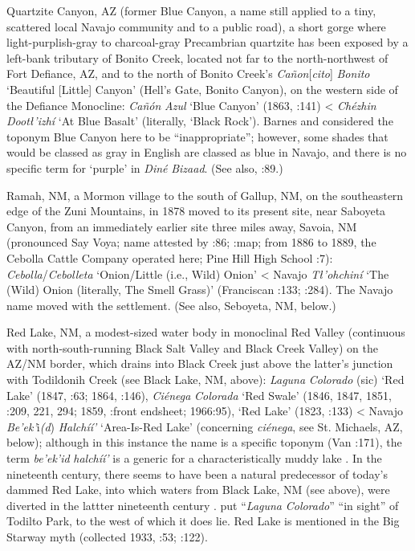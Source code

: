 Quartzite Canyon, AZ (former Blue Canyon, a name still applied to a tiny, scattered local Navajo community and to a public road), a short gorge where light-purplish-gray to charcoal-gray Precambrian quartzite has been exposed by a left-bank tributary of Bonito Creek, located not far to the north-northwest of Fort Defiance, AZ, and to the north of Bonito Creek’s \textit{Cañon}[\textit{cito}] \textit{Bonito} ‘Beautiful [Little] Canyon’ (Hell’s Gate, Bonito Canyon), on the western side of the Defiance Monocline:  \textit{Cañón} \textit{Azul} ‘Blue Canyon’ (1863, \citealt{Trafzer1982}:141) < \textit{Chézhin} \textit{Dootł’izhí} ‘At Blue Basalt’ (literally, ‘Black Rock’).  Barnes and \citet[20]{Granger1960} considered the toponym Blue Canyon here to be “inappropriate”; however, some shades that would be classed as gray in English are classed as blue in Navajo, and there is no specific term for ‘purple’ in \textit{Diné} \textit{Bizaad}.  (See also, \citealt{Gregory1916}:89.)

Ramah, NM, a Mormon village to the south of Gallup, NM, on the southeastern edge of the Zuni Mountains, in 1878 moved to its present site, near Saboyeta Canyon, from an immediately earlier site three miles away, Savoia, NM (pronounced Say Voya; name attested by \citealt{Beale1858}:86; \citealt{Dutton1886}:map; from 1886 to 1889, the Cebolla Cattle Company operated here; Pine Hill High School \citealt{Students1982}:7):  \textit{Cebolla}/\textit{Cebolleta} ‘Onion/Little (i.e., Wild) Onion’ < Navajo \textit{Tł{}'ohchiní} ‘The (Wild) Onion (literally, The Smell Grass)’ (Franciscan \citealt{Fathers1910}:133; \citealt{Julyan1998}:284).  The Navajo name moved with the settlement.  (See also, Seboyeta, NM, below.)  

Red Lake, NM, a modest-sized water body in monoclinal Red Valley (continuous with north-south-running Black Salt Valley and Black Creek Valley) on the AZ/NM border, which drains into Black Creek \citep[288]{Julyan1998} just above the latter’s junction with Todildonih Creek (see Black Lake, NM, above):  \textit{Laguna} \textit{Colorado} (sic) ‘Red Lake’ (1847, \citealt{Hughes1848}:63; 1864, \citealt{Trafzer1982}:146), \textit{Ciénega} \textit{Colorada} ‘Red Swale’ (1846, 1847, 1851, \citealt{Correll1979}:209, 221, 294; 1859, \citealt{Bailey1964a}:front endsheet; 1966:95), ‘Red Lake’ (1823, \citealt{Correll1979}:133) < Navajo \textit{Be'ek'}i\textit{(d}) \textit{Halchíí'} ‘Area-Is-Red Lake’ (concerning \textit{ciénega}, see St. Michaels, AZ, below); although in this instance the name is a specific toponym (Van \citealt{Valkenburgh1974}:171), the term \textit{be'ek'id} \textit{halchíí'} is a generic for a characteristically muddy lake \citep[40]{Brugge1993a}.  In the nineteenth century, there seems to have been a natural predecessor of today’s dammed Red Lake, into which waters from Black Lake, NM (see above), were diverted in the lattter nineteenth century \citep[24]{Haile1951}.  \citet[63]{Hughes1848} put “\textit{Laguna} \textit{Colorado}” “in sight” of Todilto Park, to the west of which it does lie.  Red Lake is mentioned in the Big Starway myth (collected 1933, \citealt{WheelwrightMcAllester1988}:53; \citealt{Linford2000}:122).  

